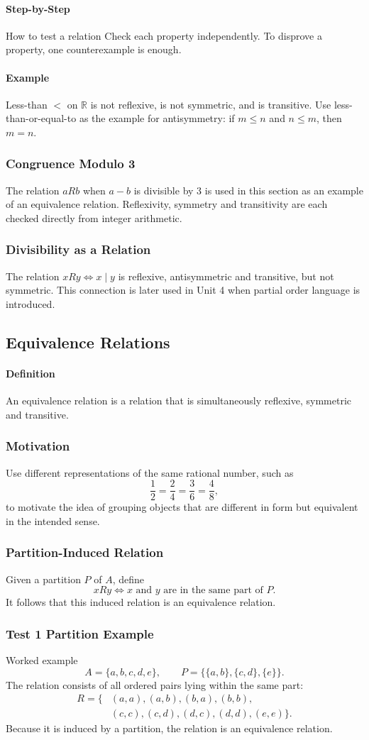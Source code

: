 \documentclass[12pt]{article}
\newcommand{\Definition}{\paragraph{Definition}}
\newcommand{\Step}{\paragraph{Step-by-Step}}
\newcommand{\Example}{\paragraph{Example}}
\begin{document}
\Step{How to test a relation}
Check each property independently. To disprove a property, one counterexample is enough.

\Example Less-than $<$ on $\mathbb R$ is not reflexive, is not symmetric, and is transitive. Use less-than-or-equal-to as the example for antisymmetry: if $m\le n$ and $n\le m$, then $m=n$.

\subsubsection{Congruence Modulo 3}
The relation $aRb$ when $a-b$ is divisible by 3 is used in this section as an example of an equivalence relation. Reflexivity, symmetry and transitivity are each checked directly from integer arithmetic.

\subsubsection{Divisibility as a Relation}
The relation $xRy\iff x\mid y$ is reflexive, antisymmetric and transitive, but not symmetric. This connection is later used in Unit 4 when partial order language is introduced.

\subsection{Equivalence Relations}
\Definition An equivalence relation is a relation that is simultaneously reflexive, symmetric and transitive.

\subsubsection{Motivation}
Use different representations of the same rational number, such as
\[
\frac12=\frac24=\frac36=\frac48,
\]
to motivate the idea of grouping objects that are different in form but equivalent in the intended sense.

\subsubsection{Partition-Induced Relation}
Given a partition $P$ of $A$, define
\[
xRy\iff\text{$x$ and $y$ are in the same part of }P.
\]
It follows that this induced relation is an equivalence relation.

\subsubsection{Test 1 Partition Example}
Worked example
\[
A=\{a,b,c,d,e\},\qquad P=\{\{a,b\},\{c,d\},\{e\}\}.
\]
The relation consists of all ordered pairs lying within the same part:
\[
\begin{aligned}
R=\{&(a,a),(a,b),(b,a),(b,b),\\
&(c,c),(c,d),(d,c),(d,d),(e,e)\}.
\end{aligned}
\]
Because it is induced by a partition, the relation is an equivalence relation.
\end{document}
